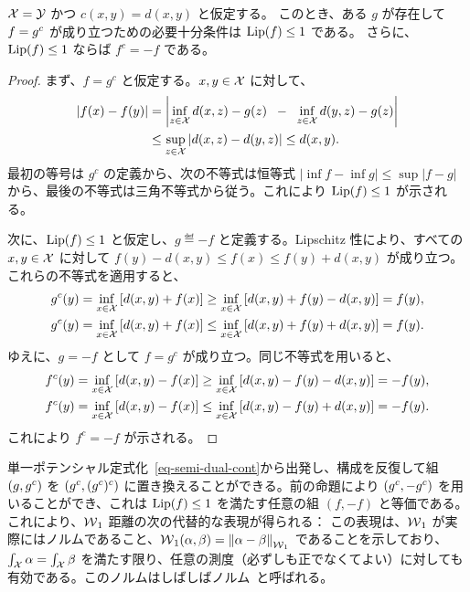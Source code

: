 \begin{prop}$\mathcal{X}=\mathcal{Y}$ かつ $c(x,y)=d(x,y)$ と仮定する。
このとき、ある $g$ が存在して $f = g^c$ が成り立つための必要十分条件は $\operatorname{Lip}(f) \leq 1$ である。
さらに、$\operatorname{Lip}(f)\leq1$ ならば $f^c=-f$ である。
\end{prop}

\begin{proof}
まず、$f=g^c$ と仮定する。$x,y\in \mathcal{X}$ に対して、
\begin{align*}
|f(x)-f(y)|&=\left|\inf_{z\in\mathcal{X}} d(x,z)-g(z) \;\; - \;\;\inf_{z\in \mathcal{X}} d(y,z)-g(z) \right|\\
&\leq \sup_{z\in\mathcal{X}} |d(x,z)-d(y,z)|\leq d(x,y).
\end{align*}
最初の等号は $g^c$ の定義から、次の不等式は恒等式 $|\inf f-\inf g|\leq\sup|f-g|$ から、最後の不等式は三角不等式から従う。これにより $\operatorname{Lip}(f)\leq1$ が示される。

次に、$\operatorname{Lip}(f)\leq1$ と仮定し、$g\eqdef -f$ と定義する。Lipschitz 性により、すべての $x,y\in\mathcal{X}$ に対して
$f(y)-d(x,y)\leq f(x)\leq f(y)+d(x,y)$ が成り立つ。
これらの不等式を適用すると、
\begin{align*}
g^c(y)&=\inf_{x\in\mathcal{X}}\left[ d(x,y) + f(x) \right]
\geq\inf_{x\in \mathcal{X}} \left[  d(x,y)+f(y)-d(x,y)\right]=f(y),\\
g^c(y)&=\inf_{x\in\mathcal{X}}\left[ d(x,y) + f(x) \right]
\leq \inf_{x\in\mathcal{X}}\left[ d(x,y) + f(y)+d(x,y) \right]=f(y).
\end{align*}
ゆえに、$g=-f$ として $f=g^c$ が成り立つ。同じ不等式を用いると、
\begin{align*}
f^c(y)&=\inf_{x\in\mathcal{X}}\left[ d(x,y) - f(x) \right]
\geq\inf_{x\in \mathcal{X}} \left[  d(x,y)-f(y)-d(x,y)\right]=-f(y),\\
f^c(y)&=\inf_{x\in\mathcal{X}}\left[ d(x,y) - f(x) \right]
\leq \inf_{x\in\mathcal{X}}\left[ d(x,y) - f(y)+d(x,y) \right]=-f(y).
\end{align*}
これにより $f^c=-f$ が示される。
\end{proof}

単一ポテンシャル定式化~\eqref{eq-semi-dual-cont}から出発し、構成を反復して組 $(g,g^c)$ を $(g^c,(g^c)^c)$ に置き換えることができる。前の命題により $(g^c,-g^c)$ を用いることができ、これは $\operatorname{Lip}(f) \leq 1$ を満たす任意の組 $(f,-f)$ と等価である。これにより、$\operatorname{\mathcal{W}}_1$ 距離の次の代替的な表現が得られる：
この表現は、$\operatorname{\mathcal{W}}_1$ が実際にはノルムであること、\ie $\operatorname{\mathcal{W}}_1(\alpha,\beta) = \left\| \alpha-\beta \right\|_{\operatorname{\mathcal{W}}_1}$ であることを示しており、$\int_{\mathcal{X}} \alpha=\int_{\mathcal{X}} \beta$ を満たす限り、任意の測度（必ずしも正でなくてよい）に対しても有効である。このノルムはしばしば\citeauthor{kantorovich1958space}ノルム~\citeyearpar{kantorovich1958space}と呼ばれる。

